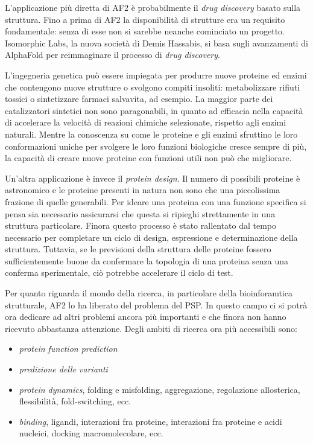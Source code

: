 L'applicazione più diretta di AF2 è probabilmente il \textit{drug discovery} basato sulla struttura. Fino a prima di AF2 la disponibilità di strutture era un requisito fondamentale: senza di esse non si sarebbe neanche cominciato un progetto. Isomorphic Labs, la nuova società di Demis Hassabis, si basa sugli avanzamenti di AlphaFold per reimmaginare il processo di \textit{drug discovery}.

\par L'ingegneria genetica può essere impiegata per produrre nuove proteine ed enzimi che contengono nuove strutture o svolgono compiti insoliti: metabolizzare rifiuti tossici o sintetizzare farmaci salvavita, ad esempio. La maggior parte dei catalizzatori sintetici non sono paragonabili, in quanto ad efficacia nella capacità di accelerare la velocità di reazioni chimiche selezionate, rispetto agli enzimi naturali. Mentre la conoscenza su come le proteine e gli enzimi sfruttino le loro conformazioni uniche per svolgere le loro funzioni biologiche cresce sempre di più, la capacità di creare nuove proteine con funzioni utili non può che migliorare\supercite{alberts2018essential}.

\par Un'altra applicazione è invece il \textit{protein design}. Il numero di possibili proteine è astronomico e le proteine presenti in natura non sono che una piccolissima frazione di quelle generabili. Per ideare una proteina con una funzione specifica si pensa sia necessario assicurarsi che questa si ripieghi strettamente in una struttura particolare. Finora questo processo è stato rallentato dal tempo necessario per completare un ciclo di design, espressione e determinazione della struttura. Tuttavia, se le previsioni della struttura delle proteine fossero sufficientemente buone da confermare la topologia di una proteina senza una conferma sperimentale, ciò potrebbe accelerare il ciclo di test. \\

\par Per quanto riguarda il mondo della ricerca, in particolare della bioinforamtica strutturale, AF2 lo ha liberato del problema del PSP. In questo campo ci si potrà ora dedicare ad altri problemi ancora più importanti e che finora non hanno ricevuto abbastanza attenzione. Degli ambiti di ricerca ora più accessibili sono:

\begin{itemize}
	\item \textit{protein function prediction} 
	\item \textit{predizione delle varianti}
	\item \textit{protein dynamics}, folding e misfolding, aggregazione, regolazione allosterica, flessibilità, fold-switching, ecc.
	\item \textit{binding}, ligandi, interazioni fra proteine, interazioni fra proteine e acidi nucleici, docking macromolecolare, ecc.
\end{itemize}

